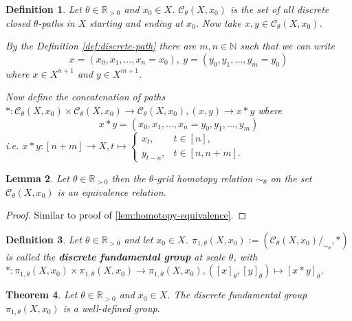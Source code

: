\documentclass[a4paper, 11pt, twoside]{article}
\newcommand{\R}[0]{\mathbb{R}}
\newcommand{\N}[0]{\mathbb{N}}
\theoremstyle{break}
\newtheorem{thm}{Theorem}[section]
\theoremstyle{break}
\newtheorem{defin}[thm]{Definition}
\newtheorem{lemma}[thm]{Lemma}
\begin{document}
\begin{defin}
  Let $\theta \in \R_{>0}$ and $x_0 \in X$. $\mathcal{C}_{\theta}(X, x_0)$ is the set of all discrete closed $\theta$-paths in $X$ starting and ending at $x_0$. Now take $x, y \in \mathcal{C}_{\theta}(X, x_0)$.
  
  By the Definition \ref{def:discrete-path} there are $m,n \in \N$ such that we can write
  \begin{equation*}
    x = (x_0, x_1, \ldots, x_n = x_0), \: y = (y_0, y_1, \ldots, y_m = y_0)
  \end{equation*} where $x \in X^{n+1}$ and $y \in X^{m+1}$.

  Now define the concatenation of paths $*\colon \mathcal{C}_{\theta}(X, x_0) \times \mathcal{C}_{\theta}(X, x_0) \to \mathcal{C}_{\theta}(X, x_0), (x, y) \to x * y$ where
  \begin{equation*}
    x * y = (x_0, x_1, \ldots, x_n = y_0, y_1, \ldots, y_m)
  \end{equation*}
  i.e. $x * y\colon [n+m] \to X, t \mapsto \begin{cases}
    x_t, &t \in [n], \\
    y_{t-n}, &t \in [n,n+m].
  \end{cases}$

  \cite[p. 3]{barcelo2014discrete}
\end{defin}

\begin{lemma} \label{lem:discrete-homotopy}
  Let $\theta \in \R_{>0}$ then the $\theta$-grid homotopy relation $\sim_{\theta}$ on the set $\mathcal{C}_{\theta}(X, x_0)$ is an equivalence relation.
\end{lemma}

\begin{proof}
  Similar to proof of \ref{lem:homotopy-equivalence}.
\end{proof}

\begin{defin}
  Let $\theta \in \R_{>0}$ and let $x_0 \in X$. $\pi_{1,\theta}(X, x_0) := (\mathcal{C}_{\theta}(X, x_0)/_{\sim_{\theta}}, *)$ is called the \textbf{discrete fundamental group} at scale $\theta$,
  with $*\colon \pi_{1,\theta}(X, x_0) \times \pi_{1,\theta}(X, x_0) \to \pi_{1,\theta}(X, x_0), ([x]_{\theta}, [y]_{\theta}) \mapsto [x * y]_{\theta}$.
\end{defin}

\begin{thm}
  Let $\theta \in \R_{>0}$ and $x_0 \in X$. The discrete fundamental group $\pi_{1,\theta}(X, x_0)$ is a well-defined group.
\end{thm}
\end{document}
